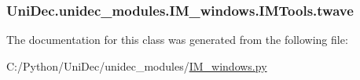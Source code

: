 \subsubsection[{twave}]{\setlength{\rightskip}{0pt plus 5cm}Uni\+Dec.\+unidec\+\_\+modules.\+I\+M\+\_\+windows.\+I\+M\+Tools.\+twave}\label{class_uni_dec_1_1unidec__modules_1_1_i_m__windows_1_1_i_m_tools_a5b3ea1abc0ceb62ab6dcdd664788b6b8}


The documentation for this class was generated from the following file\+:\begin{DoxyCompactItemize}
\item 
C\+:/\+Python/\+Uni\+Dec/unidec\+\_\+modules/\hyperlink{_i_m__windows_8py}{I\+M\+\_\+windows.\+py}\end{DoxyCompactItemize}
